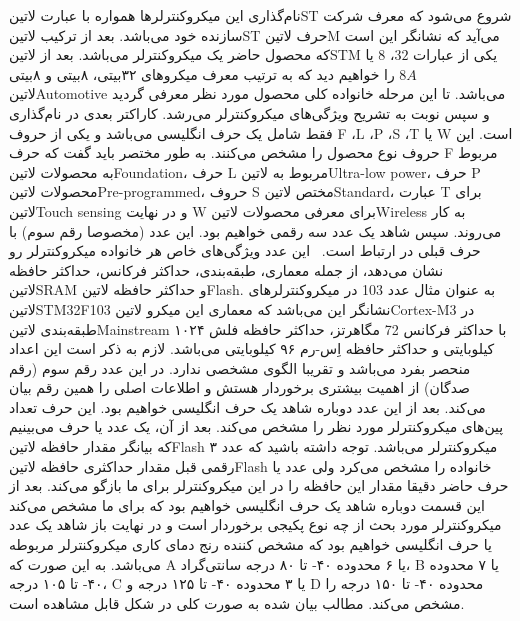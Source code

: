 نام‌گذاری این میکروکنترلرها همواره با عبارت ‌لاتین{ST} شروع می‌شود که معرف شرکت سازنده خود می‌باشد. بعد از ترکیب ‌لاتین{ST} حرف ‌لاتین{M} می‌آید که نشانگر این است که محصول حاضر یک میکروکنترلر می‌باشد. بعد از ‌لاتین{STM} یکی از عبارات $32$، $8$ یا $8A$ را خواهیم دید که به ترتیب معرف میکروهای ۳۲بیتی، ۸بیتی و ۸بیتی ‌لاتین{Automotive} می‌باشد. تا این مرحله خانواده کلی محصول مورد نظر معرفی گردید و سپس نوبت به تشریح ویژگی‌های میکروکنترلر می‌رشد. کاراکتر بعدی در نام‌گذاری فقط شامل یک حرف انگلیسی می‌باشد و یکی از حروف F ،L ،P ،S ،T یا W است. این حروف نوع محصول را مشخص می‌کنند. به طور مختصر باید گفت که حرف F مربوط به محصولات ‌لاتین{Foundation}، حرف L مربوط به ‌لاتین{Ultra-low power}، حرف P محصولات ‌لاتین{Pre-programmed}، حروف S مختص ‌لاتین{Standard}، عبارت T برای ‌لاتین{Touch sensing} و در نهایت W برای معرفی محصولات ‌لاتین{Wireless} به کار می‌روند. سپس شاهد یک عدد سه رقمی خواهیم بود. این عدد (مخصوصا رقم سوم) با حرف قبلی در ارتباط است.  این عدد ویژگی‌های خاص هر خانواده میکروکنترلر رو نشان می‌دهد، از جمله معماری، طبقه‌بندی، حداکثر فرکانس، حداکثر حافظه ‌لاتین{SRAM} و حداکثر حافظه ‌لاتین{Flash}. به عنوان مثال عدد 103 در میکروکنترلرهای ‌لاتین{STM32F103} نشانگر این می‌باشد که معماری این میکرو ‌لاتین{Cortex-M3} در طبقه‌بندی ‌لاتین{Mainstream} با حداکثر فرکانس 72 مگاهرتز، حداکثر حافظه فلش ۱۰۲۴ کیلوبایتی و حداکثر حافظه اِس-رم ۹۶ کیلوبایتی می‌باشد. لازم به ذکر است این اعداد منحصر بفرد می‌باشد و تقریبا الگوی مشخصی ندارد. در این عدد رقم سوم (رقم صدگان) از اهمیت بیشتری برخوردار هستش و اطلاعات اصلی را همین رقم بیان می‌کند. بعد از این عدد دوباره شاهد یک حرف انگلیسی خواهیم بود. این حرف تعداد پین‌های میکروکنترلر مورد نظر را مشخص می‌کند. بعد از آن، یک عدد یا حرف می‌بینیم که بیانگر مقدار حافظه ‌لاتین{Flash} میکروکنترلر می‌باشد. توجه داشته باشید که عدد ۳ رقمی قبل مقدار حداکثری حافظه ‌لاتین{Flash} خانواده را مشخص می‌کرد ولی عدد یا حرف حاضر دقیقا مقدار این حافظه را در این میکروکنترلر برای ما بازگو می‌کند. بعد از این قسمت دوباره شاهد یک حرف انگلیسی خواهیم بود که برای ما مشخص می‌کند میکروکنترلر مورد بحث از چه نوع پکیجی برخوردار است و در نهایت باز شاهد یک عدد یا حرف انگلیسی خواهیم بود که مشخص کننده رنج دمای کاری میکروکنترلر مربوطه می‌باشد. به این صورت که A یا ۶ محدوده ۴۰- تا ۸۰ درجه سانتی‌گراد، B یا ۷ محدوده ۴۰- تا ۱۰۵ درجه، C یا ۳ محدوده ۴۰- تا ۱۲۵ درجه و D محدوده ۴۰- تا ۱۵۰ درجه را مشخص می‌کند. مطالب بیان شده به صورت کلی در شکل  قابل مشاهده است.

